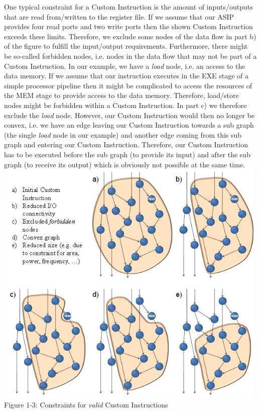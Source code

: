 \documentclass[
]{article}
\begin{document}
One typical constraint for a Custom Instruction is the amount of
inputs/outputs that are read from/written to the register file. If we
assume that our ASIP provides four read ports and two write ports then
the shown Custom Instruction exceeds these limits. Therefore, we exclude
some nodes of the data flow in part b) of the figure to fulfill the
input/output requirements. Furthermore, there might be so-called
forbidden nodes, i.e. nodes in the data flow that may not be part of a
Custom Instruction. In our example, we have a \emph{load} node, i.e. an
access to the data memory. If we assume that our instruction executes in
the EXE stage of a simple processor pipeline then it might be
complicated to access the resources of the MEM stage to provide access
to the data memory. Therefore, load/store nodes might be forbidden
within a Custom Instruction. In part c) we therefore exclude the
\emph{load} node. However, our Custom Instruction would then no longer
be convex, i.e. we have an edge leaving our Custom Instruction towards a
sub graph (the single \emph{load} node in our example) and another edge
coming from this sub graph and entering our Custom Instruction.
Therefore, our Custom Instruction has to be executed {before} the sub
graph (to provide its input) and {after} the sub graph (to receive its
output) which is obviously not possible at the same time.
\includegraphics[width=5.86597in,height=4.73125in]{1-3.png}
Figure 1‑3:\protect\hypertarget{Fig13}{}{} Constraints for \emph{valid}
Custom Instructions
\end{document}
